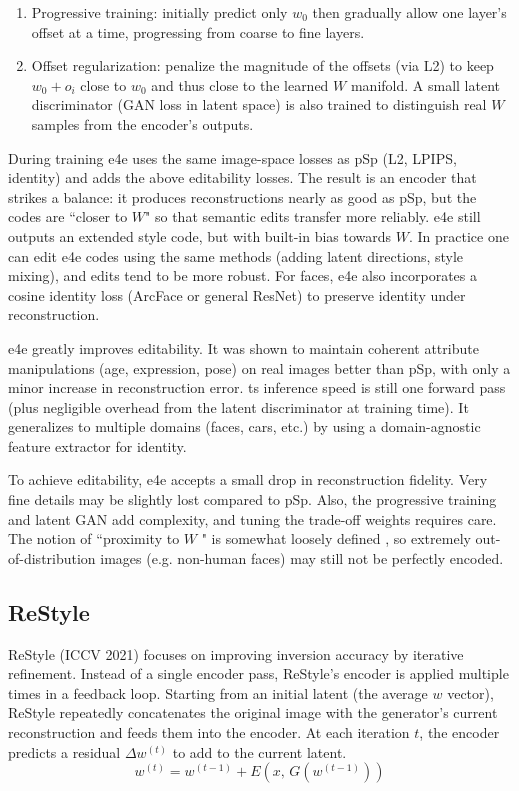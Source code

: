 \begin{enumerate}
    \item Progressive training: initially predict only $w_0$ then gradually allow one layer's offset at a time, progressing from coarse to fine layers.
    \item Offset regularization: penalize the magnitude of the offsets (via L2) to keep $w_0 + o_i$ close to $w_0$ and thus close to the learned $W$ manifold.  A small latent discriminator (GAN loss in latent space) is also trained to distinguish real $W$ samples from the encoder's outputs. 
\end{enumerate}

During training e4e uses the same image-space losses as pSp (L2, LPIPS, identity) and adds the above editability losses.
The result is an encoder that strikes a balance: it produces reconstructions nearly as good as pSp, but the codes are “closer to $W$" so that semantic edits transfer more reliably.
e4e still outputs an extended style code, but with built-in bias towards $W$. In practice one can edit e4e codes using the same methods (adding latent directions, style mixing), and edits tend to be more robust. For faces, e4e also incorporates a cosine identity loss (ArcFace or general ResNet) to preserve identity under reconstruction.

e4e greatly improves editability. It was shown to maintain coherent attribute manipulations (age, expression, pose) on real images better than pSp, with only a minor increase in reconstruction error.
ts inference speed is still one forward pass (plus negligible overhead from the latent discriminator at training time). It generalizes to multiple domains (faces, cars, etc.) by using a domain-agnostic feature extractor for identity.

To achieve editability, e4e accepts a small drop in reconstruction fidelity. Very fine details may be slightly lost compared to pSp. Also, the progressive training and latent GAN add complexity, and tuning the trade-off weights requires care. 
 The notion of “proximity to $W$ " is somewhat loosely defined , so extremely out-of-distribution images (e.g. non-human faces) may still not be perfectly encoded.
\cite{tov2021designingencoderstyleganimage}

\subsection{ReStyle}

ReStyle (ICCV 2021) focuses on improving inversion accuracy by iterative refinement. Instead of a single encoder pass, ReStyle's encoder is applied multiple times in a feedback loop. Starting from an initial latent (the average 
$w$ vector), ReStyle repeatedly concatenates the original image with the generator's current reconstruction and feeds them into the encoder. At each iteration $t$, the encoder predicts a residual $\Delta w^{(t)}$ to add to the current latent.
\begin{equation}
w^{(t)} = w^{(t-1)} + E(x,\,G(w^{(t-1)}))
\label{eq:restyle_update}
\end{equation}


